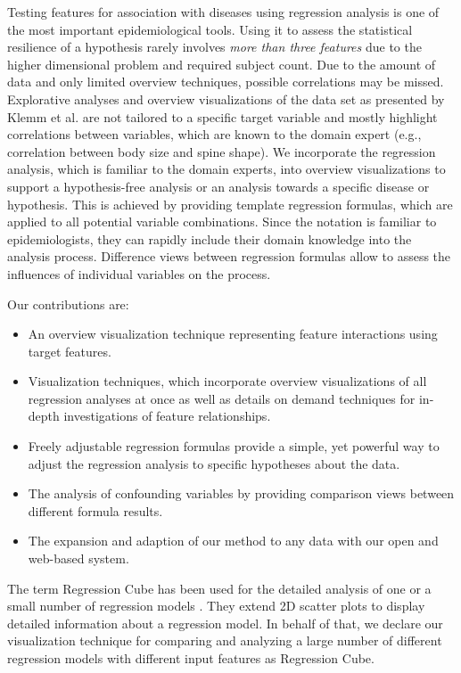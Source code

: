\documentclass[journal]{style/vgtc} 			          %
\begin{document}
Testing features for association with diseases using regression analysis is one of the most important epidemiological tools.
Using it to assess the statistical resilience of a hypothesis rarely involves \emph{more than three features} due to the higher dimensional problem and required subject count.
Due to the amount of data and only limited overview techniques, possible correlations may be missed.
Explorative analyses and overview visualizations of the data set as presented by Klemm et al. \cite{Klemm2014VIS} are not tailored to a specific target variable and mostly highlight correlations between variables, which are known to the domain expert (e.g., correlation between body size and spine shape).
We incorporate the regression analysis, which is familiar to the domain experts, into overview visualizations to support a hypothesis-free analysis or an analysis towards a specific disease or hypothesis.
This is achieved by providing template regression formulas, which are applied to all potential variable combinations.
Since the notation is familiar to epidemiologists, they can rapidly include their domain knowledge into the analysis process.
Difference views between regression formulas allow to assess the influences of individual variables on the process.

Our contributions are:
\begin{itemize}
	\item An overview visualization technique representing feature interactions using target features.
	\item Visualization techniques, which incorporate overview visualizations of all regression analyses at once as well as details on demand techniques for in-depth investigations of feature relationships.
	\item Freely adjustable regression formulas provide a simple, yet powerful way to adjust the regression analysis to specific hypotheses about the data.
	\item The analysis of confounding variables by providing comparison views between different formula results.
	\item The expansion and adaption of our method to any data with our open and web-based system.
\end{itemize}
The term Regression Cube has been used for the detailed analysis of one or a small number of regression models \cite{Chan, Ahmadi}.
They extend 2D scatter plots to display detailed information about a regression model.
In behalf of that, we declare our visualization technique for comparing and analyzing a large number of different regression models with different input features as Regression Cube.
\end{document}
